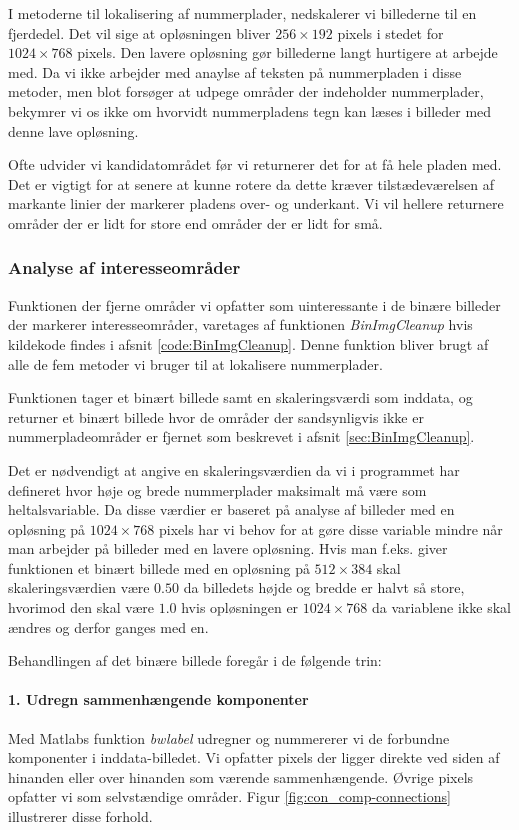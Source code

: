 I metoderne til lokalisering af nummerplader, nedskalerer vi billederne til en fjerdedel. Det vil sige at opløsningen bliver $256 \times 192$ pixels i stedet for $1024 \times 768$ pixels. Den lavere opløsning gør billederne langt hurtigere at arbejde med. Da vi ikke arbejder med anaylse af teksten på nummerpladen i disse metoder, men blot forsøger at udpege områder der indeholder nummerplader, bekymrer vi os ikke om hvorvidt nummerpladens tegn kan læses i billeder med denne lave opløsning.

Ofte udvider vi kandidatområdet før vi returnerer det for at få hele pladen med. Det er vigtigt for at senere at kunne rotere da dette kræver tilstædeværelsen af markante linier der markerer pladens over- og underkant. Vi vil hellere returnere områder der er lidt for store end områder der er lidt for små.



\subsubsection{Analyse af interesseområder}
\label{sec:imp:BinImgCleanup}
Funktionen der fjerne områder vi opfatter som uinteressante i de binære billeder der markerer interesseområder, varetages af funktionen \textit{BinImgCleanup} hvis kildekode findes i afsnit \vref{code:BinImgCleanup}. Denne funktion bliver brugt af alle de fem metoder vi bruger til at lokalisere nummerplader.

Funktionen tager et binært billede samt en skaleringsværdi som inddata, og returner et binært billede hvor de områder der sandsynligvis ikke er nummerpladeområder er fjernet som beskrevet i afsnit \vref{sec:BinImgCleanup}.

Det er nødvendigt at angive en skaleringsværdien da vi i programmet har defineret hvor høje og brede nummerplader maksimalt må være som heltalsvariable. Da disse værdier er baseret på analyse af billeder med en opløsning på $1024 \times 768$ pixels har vi behov for at gøre disse variable mindre når man arbejder på billeder med en lavere opløsning. Hvis man f.eks. giver funktionen et binært billede med en opløsning på $512 \times 384$ skal skaleringsværdien være $0.50$ da billedets højde og bredde er halvt så store, hvorimod den skal være $1.0$ hvis opløsningen er $1024 \times 768$ da variablene ikke skal ændres og derfor ganges med en.

Behandlingen af det binære billede foregår i de følgende trin:

\paragraph{1. Udregn sammenhængende komponenter}
Med Matlabs funktion \textit{bwlabel} udregner og nummererer vi de forbundne komponenter i inddata-billedet. Vi opfatter pixels der ligger direkte ved siden af hinanden eller over hinanden som værende sammenhængende. Øvrige pixels opfatter vi som selvstændige områder. Figur \vref{fig:con_comp-connections} illustrerer disse forhold.

